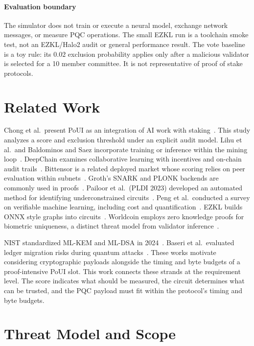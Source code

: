 \documentclass[conference]{IEEEtran}
\begin{document}
\paragraph{Evaluation boundary}
The simulator does not train or execute a neural model, exchange network messages, or measure PQC operations. The small EZKL run is a toolchain smoke test, not an EZKL/Halo2 audit or general performance result. The vote baseline is a toy rule: its $0.02$ exclusion probability applies only after a malicious validator is selected for a 10 member committee. It is not representative of proof of stake protocols.
\section{Related Work}
\label{sec:related}

Chong et al.\ present PoUI as an integration of AI work with staking~\cite{chong2025poui}. This study analyzes a score and exclusion threshold under an explicit audit model. Lihu et al.\ and Baldominos and Saez incorporate training or inference within the mining loop~\cite{lihu2020pouw,baldominos2019coinai}. DeepChain examines collaborative learning with incentives and on-chain audit trails~\cite{weng2021deepchain}. Bittensor is a related deployed market whose scoring relies on peer evaluation within subnets~\cite{bittensor2024}.
Groth's SNARK and PLONK backends are commonly used in proofs~\cite{groth2016,plonk2019}. Pailoor et al.\ (PLDI 2023) developed an automated method for identifying underconstrained circuits~\cite{pailoor2023pldi}. Peng et al.\ conducted a survey on verifiable machine learning, including cost and quantification~\cite{peng2025zkml}. EZKL builds ONNX style graphs into circuits~\cite{ezkl2024}. Worldcoin employs zero knowledge proofs for biometric uniqueness, a distinct threat model from validator inference~\cite{worldcoin2023}.

NIST standardized ML-KEM and ML-DSA in 2024~\cite{nistfips203,nistfips204}. Baseri et al.\ evaluated ledger migration risks during quantum attacks~\cite{baseri2025quantum}. These works motivate considering cryptographic payloads alongside the timing and byte budgets of a proof-intensive PoUI slot.
This work connects these strands at the requirement level.
The score indicates what should be measured, the circuit determines what can be trusted, and the PQC payload must fit within the protocol's timing and byte budgets.

\section{Threat Model and Scope}
\label{sec:threat}
\end{document}
